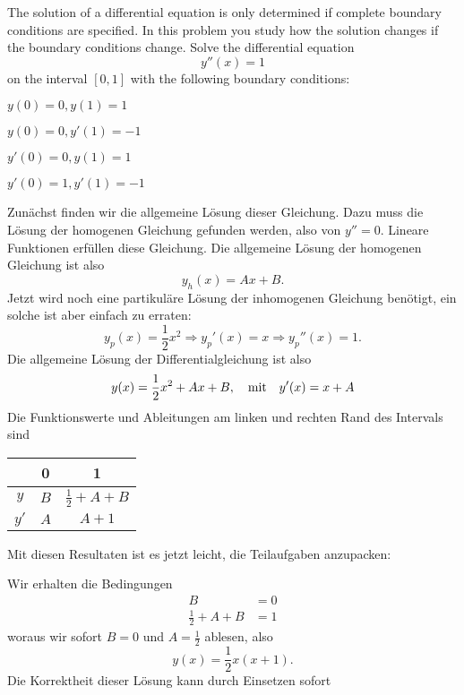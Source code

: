 The solution of a differential equation is only determined if
complete boundary conditions are specified.
In this problem you study how the solution changes if the boundary
conditions change.
Solve the differential equation
\[
y''(x)=1
\]
on the interval $[0,1]$ with the following boundary conditions:
\begin{teilaufgaben}
\item $y(0)=0, y(1)=1$
\item $y(0)=0, y'(1)=-1$
\item $y'(0)=0, y(1)=1$
\item $y'(0)=1, y'(1)=-1$
\end{teilaufgaben}

\begin{loesung}
Zunächst finden wir die allgemeine Lösung dieser Gleichung.
Dazu muss die Lösung der homogenen Gleichung gefunden werden,
also von $y''=0$. Lineare Funktionen erfüllen diese Gleichung.
Die allgemeine Lösung der homogenen Gleichung ist also
\[
y_h(x)=Ax+B.
\]
Jetzt wird noch eine partikuläre Lösung der inhomogenen
Gleichung benötigt, ein solche ist aber einfach zu
erraten:
\[
y_p(x)=\frac12x^2\Rightarrow y_p'(x)=x\Rightarrow y_p''(x)=1.
\]
Die allgemeine Lösung der Differentialgleichung ist also
\[
y(x)=\frac12x^2+Ax+B, \text{\quad mit\quad} y'(x)=x+A
\]
Die Funktionswerte und Ableitungen am linken und rechten
Rand des Intervals sind
\begin{center}
\begin{tabular}{|c|cc|}
\hline
&0&1\\
\hline
$y$&$B$&$\frac12 +A+B$\\
$y'$&$A$&$A+1$\\
\hline
\end{tabular}
\end{center}
Mit diesen Resultaten ist es jetzt leicht, die Teilaufgaben anzupacken:
\begin{teilaufgaben}
\item Wir erhalten die Bedingungen
\begin{align*}
B&=0\\
\frac12+A+B&=1
\end{align*}
woraus wir sofort $B=0$ und $A=\frac12$ ablesen, also
\[
y(x)=\frac12x(x+1).
\]
Die Korrektheit dieser Lösung kann durch Einsetzen sofort

\end{teilaufgaben}
\end{loesung}
